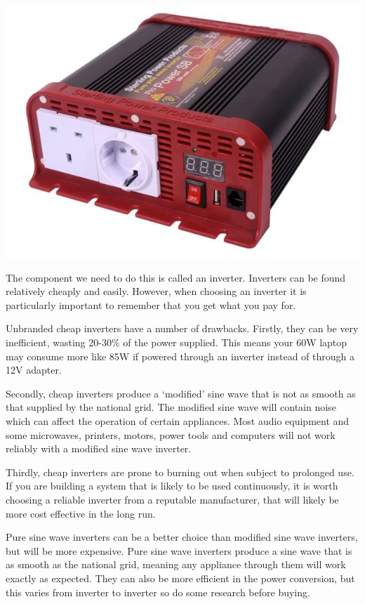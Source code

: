 \documentclass{article}
\theoremstyle{definition}
\theoremstyle{definition}
\theoremstyle{remark}
\begin{document}
    \begin{center}
      \includegraphics[width=0.15\paperwidth]{../Images/image_10_1_(inverter).png}
    \end{center}
    
    The component we need to do this is called an inverter. Inverters can be found relatively cheaply and easily. However, when choosing an inverter it is particularly important to remember that you get what you pay for.

    Unbranded cheap inverters have a number of drawbacks. Firstly, they can be very inefficient, wasting 20-30\% of the power supplied. This means your 60W laptop may consume more like 85W if powered through an inverter instead of through a 12V adapter.

    Secondly, cheap inverters produce a ‘modified’ sine wave that is not as smooth as that supplied by the national grid. The modified sine wave will contain noise which can affect the operation of certain appliances. Most audio equipment and some microwaves, printers, motors, power tools and computers will not work reliably with a modified sine wave inverter.

    Thirdly, cheap inverters are prone to burning out when subject to prolonged use. If you are building a system that is likely to be used continuously, it is worth choosing a reliable inverter from a reputable manufacturer, that will likely be more cost effective in the long run.

    Pure sine wave inverters can be a better choice than modified sine wave inverters, but will be more expensive. Pure sine wave inverters produce a sine wave that is as smooth as the national grid, meaning any appliance through them will work exactly as expected. They can also be more efficient in the power conversion, but this varies from inverter to inverter so do some research before buying.
\end{document}

